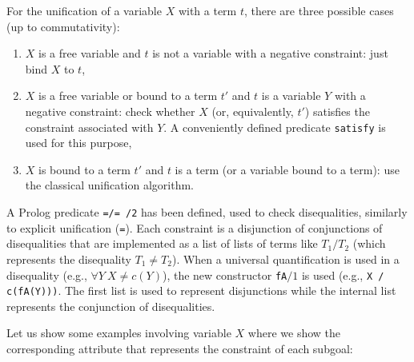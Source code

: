 \documentclass{llncs}
\begin{document}

For the unification of a variable $X$ with a term $t$, there are three
possible cases (up to commutativity):

\begin{enumerate}

   \item $X$ is a free variable and $t$ is not a variable with a
   negative constraint: just bind $X$ to $t$,

   \item $X$ is a free variable or bound to a term $t'$ and $t$ is a
   variable $Y$ with a negative constraint: check whether $X$ (or,
   equivalently, $t'$) satisfies the constraint associated with $Y$.
   A conveniently defined predicate {\tt satisfy} is used for this
   purpose,

   \item $X$ is bound to a term $t'$ and $t$ is a term (or a variable
   bound to a term): use the classical unification algorithm.

\end{enumerate}

A Prolog predicate {\tt =/= /2} \cite{SusanaPADL2000} has been
defined, used to check disequalities, similarly to explicit
unification ({\tt =}). Each constraint is a disjunction of
conjunctions of disequalities that are implemented as a list of lists
of terms like $T_1/T_2$ (which represents the disequality $T_1 \neq
T_2$). When a universal quantification is used in a disequality (e.g.,
$\forall Y~ X \neq c(Y)$), the new constructor {\tt fA}$/1$ is used
(e.g., {\tt X / c(fA(Y)))}.  The first list is used to represent
disjunctions while the internal list represents the conjunction of
disequalities.

Let us show some examples involving variable $X$ where we show the
corresponding attribute that represents the constraint of each
subgoal:
\end{document}
